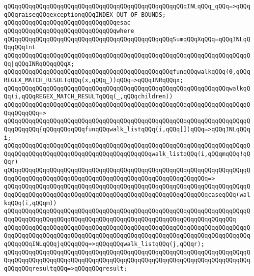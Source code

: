 \verb|qQQqqQQqqQQqqQQqqQQqqQQqqQQqqQQqqQQqqQQqqQQqqQQqqQQqINLqQQq_qQQq=>qQQqqQQqraiseqQQqexceptionqQQqINDEX_OUT_OF_BOUNDS;|\newline
\verb|qQQqqQQqqQQqqQQqqQQqqQQqqQQqqQQqesac|\newline
\verb|qQQqqQQqqQQqqQQqqQQqqQQqqQQqqQQqwhere|\newline
\newline
\verb|qQQqqQQqqQQqqQQqqQQqqQQqqQQqqQQqqQQqqQQqqQQqqQQqSumqQQqXqQQq=qQQqINLqQQqqQQqInt|\newline
\verb|qQQqqQQqqQQqqQQqqQQqqQQqqQQqqQQqqQQqqQQqqQQqqQQqqQQqqQQqqQQqqQQqqQQqqQQq|\verb#|qQQqINRqQQqqQQqX;#\newline
\newline
\verb|qQQqqQQqqQQqqQQqqQQqqQQqqQQqqQQqqQQqqQQqqQQqqQQqfunqQQqwalkqQQq(0,qQQqREGEX_MATCH_RESULTqQQq(x,qQQq_))qQQq=>qQQqINRqQQqx;|\newline
\newline
\verb|qQQqqQQqqQQqqQQqqQQqqQQqqQQqqQQqqQQqqQQqqQQqqQQqqQQqqQQqqQQqqQQqwalkqQQq(i,qQQqREGEX_MATCH_RESULTqQQq(_,qQQqchildren))|\newline
\verb|qQQqqQQqqQQqqQQqqQQqqQQqqQQqqQQqqQQqqQQqqQQqqQQqqQQqqQQqqQQqqQQqqQQqqQQqqQQqqQQq=>|\newline
\verb|qQQqqQQqqQQqqQQqqQQqqQQqqQQqqQQqqQQqqQQqqQQqqQQqqQQqqQQqqQQqqQQqqQQqqQQqqQQqqQQq{qQQqqQQqqQQqfunqQQqwalk_listqQQq(i,qQQq[])qQQq=>qQQqINLqQQqi;|\newline
\newline
\verb|qQQqqQQqqQQqqQQqqQQqqQQqqQQqqQQqqQQqqQQqqQQqqQQqqQQqqQQqqQQqqQQqqQQqqQQqqQQqqQQqqQQqqQQqqQQqqQQqqQQqqQQqqQQqqQQqwalk_listqQQq(i,qQQqmqQQq!qQQqr)|\newline
\verb|qQQqqQQqqQQqqQQqqQQqqQQqqQQqqQQqqQQqqQQqqQQqqQQqqQQqqQQqqQQqqQQqqQQqqQQqqQQqqQQqqQQqqQQqqQQqqQQqqQQqqQQqqQQqqQQqqQQqqQQqqQQqqQQq=>|\newline
\verb|qQQqqQQqqQQqqQQqqQQqqQQqqQQqqQQqqQQqqQQqqQQqqQQqqQQqqQQqqQQqqQQqqQQqqQQqqQQqqQQqqQQqqQQqqQQqqQQqqQQqqQQqqQQqqQQqqQQqqQQqqQQqqQQqcaseqQQq(walkqQQq(i,qQQqm))|\newline
\verb|qQQqqQQqqQQqqQQqqQQqqQQqqQQqqQQqqQQqqQQqqQQqqQQqqQQqqQQqqQQqqQQqqQQqqQQqqQQqqQQqqQQqqQQqqQQqqQQqqQQqqQQqqQQqqQQqqQQqqQQqqQQqqQQqqQQqqQQq|\newline
\verb|qQQqqQQqqQQqqQQqqQQqqQQqqQQqqQQqqQQqqQQqqQQqqQQqqQQqqQQqqQQqqQQqqQQqqQQqqQQqqQQqqQQqqQQqqQQqqQQqqQQqqQQqqQQqqQQqqQQqqQQqqQQqqQQqqQQqqQQqqQQqqQQqqQQqINLqQQqjqQQqqQQq=>qQQqqQQqwalk_listqQQq(j,qQQqr);|\newline
\verb|qQQqqQQqqQQqqQQqqQQqqQQqqQQqqQQqqQQqqQQqqQQqqQQqqQQqqQQqqQQqqQQqqQQqqQQqqQQqqQQqqQQqqQQqqQQqqQQqqQQqqQQqqQQqqQQqqQQqqQQqqQQqqQQqqQQqqQQqqQQqqQQqqQQqresultqQQq=>qQQqqQQqresult;|\newline
